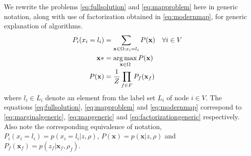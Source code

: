 \documentclass[letterpaper, 10 pt, conference]{ieeeconf} %
\DeclareMathOperator*{\argmax}{arg\,max}
\newcommand{\vect}[1]{\mathbf{#1}}
\newcommand{\field}[1]{\mathbb{#1}}
\newcommand{\Real}[0]{\field{R}}
\begin{document}

We rewrite the problems \eqref{eq:fullsolution} and \eqref{eq:mapproblem} here
in generic notation, along with use of factorization obtained in
\eqref{eq:modernmap}, for generic explanation of algorithms.
\begin{align}
  P_i(x_i = l_i) &= \sum_{\map \in \Omega : x_i = l_i} P(\vect{x}) & \forall i \in V
  \label{eq:marginalgeneric}
  \\
     \vect{x}* &= \argmax_{\vect{x} \in \Omega} P(\vect{x})
  \label{eq:mapgeneric}
  \\
   P(\vect{x}) &= \frac{1}{Z}\prod_{f \in F} P_f(\vect{x}_f)
  \label{eq:factorizationgeneric}
\end{align}
where  $l_i \in L_i$ denote an element from the label set $L_i$ of node $i \in V$.
The equations \eqref{eq:fullsolution}, \eqref{eq:mapproblem} and
\eqref{eq:modernmap} correspond to \eqref{eq:marginalgeneric},
\eqref{eq:mapgeneric} and \eqref{eq:factorizationgeneric} respectively. Also
note the corresponding equivalence of notation, $P_i(x_i = l_i) = p(x_i = l_i|z, \rho)$, $P(\vect{x}) = p(\vect{x}|z, \rho)$ and $P_f(\vect{x}_f) = p(z_f|\vect{x}_f, \rho_f)$.
\end{document}
